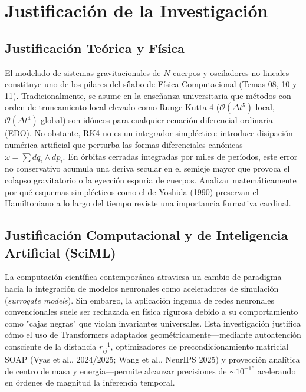 \documentclass[11pt,a4paper]{article}
\begin{document}
\section{Justificación de la Investigación}

\subsection{Justificación Teórica y Física}
El modelado de sistemas gravitacionales de $N$-cuerpos y osciladores no lineales constituye uno de los pilares del sílabo de Física Computacional (Temas 08, 10 y 11). Tradicionalmente, se asume en la enseñanza universitaria que métodos con orden de truncamiento local elevado como Runge-Kutta 4 ($\mathcal{O}(\Delta t^5)$ local, $\mathcal{O}(\Delta t^4)$ global) son idóneos para cualquier ecuación diferencial ordinaria (EDO). No obstante, RK4 no es un integrador simpléctico: introduce disipación numérica artificial que perturba las formas diferenciales canónicas $\omega = \sum dq_i \wedge dp_i$. En órbitas cerradas integradas por miles de períodos, este error no conservativo acumula una deriva secular en el semieje mayor que provoca el colapso gravitatorio o la eyección espuria de cuerpos. Analizar matemáticamente por qué esquemas simplécticos como el de Yoshida (1990) preservan el Hamiltoniano a lo largo del tiempo reviste una importancia formativa cardinal.

\subsection{Justificación Computacional y de Inteligencia Artificial (SciML)}
La computación científica contemporánea atraviesa un cambio de paradigma hacia la integración de modelos neuronales como aceleradores de simulación (\textit{surrogate models}). Sin embargo, la aplicación ingenua de redes neuronales convencionales suele ser rechazada en física rigurosa debido a su comportamiento como "cajas negras" que violan invariantes universales. Esta investigación justifica cómo el uso de Transformers adaptados geométricamente—mediante autoatención consciente de la distancia $r_{ij}^{-1}$, optimizadores de precondicionamiento matricial SOAP (Vyas et al., 2024/2025; Wang et al., NeurIPS 2025) y proyección analítica de centro de masa y energía—permite alcanzar precisiones de $\sim 10^{-16}$ acelerando en órdenes de magnitud la inferencia temporal.
\end{document}
